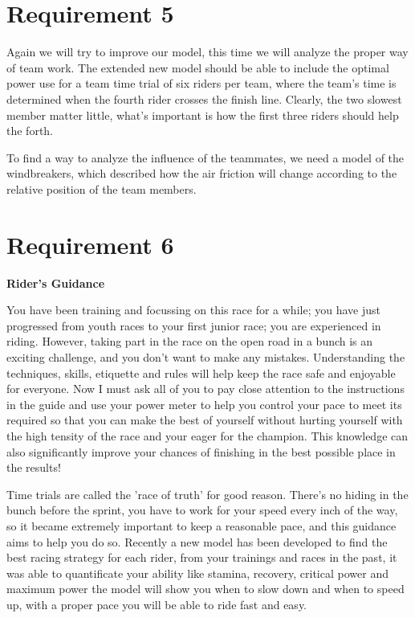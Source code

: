 \documentclass[12pt]{article}
\begin{document}
\section{Requirement 5}
Again we will try to improve our model, this time we will analyze the proper way of team work. The extended new model should be able to  include the optimal power use for a team time trial of six riders per team, where the team's time is
determined when the fourth rider crosses the finish line. Clearly, the two slowest member matter little, what's important is how the first three riders should help the forth.

To find a way to analyze the influence of the teammates, we need a model of the windbreakers, which described how the air friction will change according to the relative
position of the team members.
\newpage
\section{Requirement 6}
\begin{center}
    \huge \textbf{Rider's Guidance}
\end{center}\large
You have been training and focussing on this race for a while; you  have just progressed from youth races to your first junior race; you are experienced in riding.
However, taking part in the race on the open road in a bunch is an exciting challenge, and you don't want to make any mistakes.
Understanding the techniques, skills, etiquette and rules will help keep the race safe and enjoyable for everyone. Now I must ask all of you to pay close attention to the instructions in the guide and use your power meter
to help you control your pace to meet its required so that you can make the best of yourself without hurting yourself with the high tensity of the race and your eager for
the champion. This knowledge can also significantly improve your chances of finishing in the best possible place in the results!

Time trials are called the 'race of truth' for good reason. There's no hiding in the bunch before the sprint, you have to work for your speed every inch of the way, so it
became extremely  important to keep a reasonable pace, and this guidance aims to help you do so.
Recently a new model has been developed to find the best racing strategy for each rider, from your trainings and races in the past, it was able to quantificate your ability
like stamina, recovery, critical power and maximum power the model will show you when to slow down and when to speed up, with a proper pace you will be able to ride
fast and easy.
\end{document}

